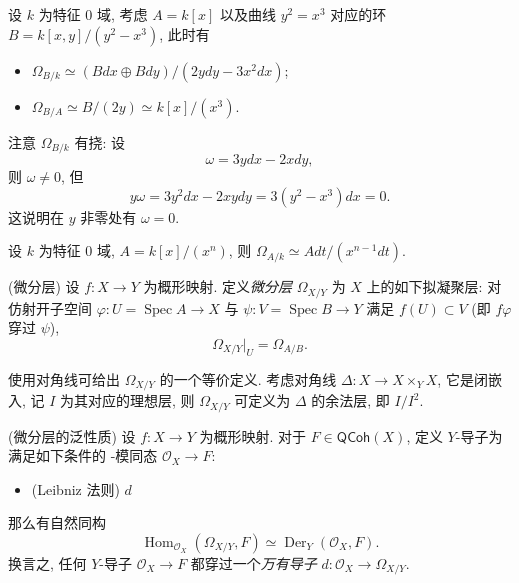 \documentclass{book}
\newcommand{\todo}[1]{{\color{blue}\fbox{TODO: \textbf{#1}}}}
\begin{document}
	\begin{example}
		{}
		设 $k$ 为特征 $0$ 域, 考虑 $A=k[x]$ 以及曲线 $y^2=x^3$ 对应的环 $B=k[x,y]/(y^2-x^3)$,
		此时有
		\begin{itemize}
			\item $
			\Omega_{B/k} \simeq (Bdx\oplus Bdy)/(2ydy-3x^2dx)
			$;
			\item 
			$\Omega_{B/A} \simeq B/(2y) \simeq k[x]/(x^3)$.
		\end{itemize}
		
		注意 $\Omega_{B/k}$ 有挠: 设 $$\omega = 3ydx - 2xdy,$$ 则 $\omega\neq 0$, 但 $$y\omega = 3y^2dx - 2xydy = 3(y^2-x^3)dx = 0.$$
		这说明在 $y$ 非零处有 $\omega = 0$.
	\end{example}
	
	\begin{example}
		{}
		设 $k$ 为特征 $0$ 域, $A=k[x]/(x^n)$,
		则 $\Omega_{A/k} \simeq Adt/(x^{n-1}dt)$.
	\end{example}
	
	\begin{definition}
		{(微分层)}
		设 $f\colon X\to Y$ 为概形映射. 定义\emph{微分层} $\Omega_{X/Y}$ 为 $X$ 上的如下拟凝聚层: 对仿射开子空间 $\varphi\colon U=\operatorname{Spec} A \to X$ 与 $\psi\colon V=\operatorname{Spec} B\to Y$ 满足 $f(U)\subset V$ (即 $f\varphi$ 穿过 $\psi$),
		$$
		\Omega_{X/Y}|_U = \Omega_{A/B}.
		$$
		
		使用对角线可给出 $\Omega_{X/Y}$ 的一个等价定义. 考虑对角线 $\Delta\colon X\to X\times_Y X$, 它是闭嵌入, 记 $I$ 为其对应的理想层, 则 $\Omega_{X/Y}$ 可定义为 $\Delta$ 的余法层, 即 $I/I^2$.
	\end{definition}
	
	\begin{prop}
		{(微分层的泛性质)}
		设 $f\colon X\to Y$ 为概形映射. 对于 $F\in\mathsf{QCoh}(X)$, 定义 $Y$-导子为满足如下条件的 \todo{}-模同态 $\mathcal O_X\to F$:
		\begin{itemize}
			\item (Leibniz 法则) $d$
		\end{itemize}
		
		那么有自然同构
		$$
		\operatorname{Hom}_{\mathcal O_X}(\Omega_{X/Y},F) \simeq \operatorname{Der}_Y(\mathcal O_X,F).
		$$
		换言之, 任何 $Y$-导子 $\mathcal O_X\to F$ 都穿过一个\emph{万有导子} $d\colon \mathcal O_X\to\Omega_{X/Y}$.
	\end{prop}
	
\end{document}
